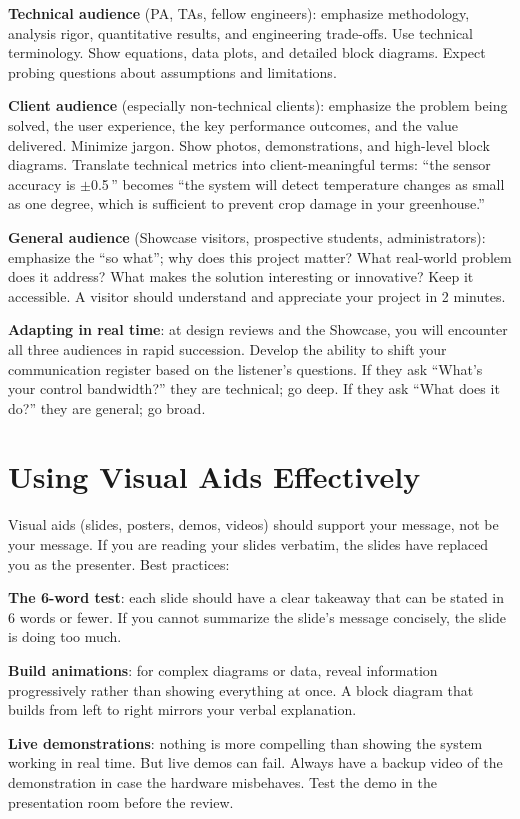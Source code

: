 \textbf{Technical audience} (PA, TAs, fellow engineers): emphasize methodology, analysis rigor, quantitative results, and engineering trade-offs. Use technical terminology. Show equations, data plots, and detailed block diagrams. Expect probing questions about assumptions and limitations.

\textbf{Client audience} (especially non-technical clients): emphasize the problem being solved, the user experience, the key performance outcomes, and the value delivered. Minimize jargon. Show photos, demonstrations, and high-level block diagrams. Translate technical metrics into client-meaningful terms: ``the sensor accuracy is $\pm$0.5\,\degC{}'' becomes ``the system will detect temperature changes as small as one degree, which is sufficient to prevent crop damage in your greenhouse.''

\textbf{General audience} (Showcase visitors, prospective students, administrators): emphasize the ``so what''; why does this project matter? What real-world problem does it address? What makes the solution interesting or innovative? Keep it accessible. A visitor should understand and appreciate your project in 2 minutes.

\textbf{Adapting in real time}: at design reviews and the Showcase, you will encounter all three audiences in rapid succession. Develop the ability to shift your communication register based on the listener's questions. If they ask ``What's your control bandwidth?'' they are technical; go deep. If they ask ``What does it do?'' they are general; go broad.

\section{Using Visual Aids Effectively}
Visual aids (slides, posters, demos, videos) should support your message, not be your message. If you are reading your slides verbatim, the slides have replaced you as the presenter. Best practices:

\textbf{The 6-word test}: each slide should have a clear takeaway that can be stated in 6 words or fewer. If you cannot summarize the slide's message concisely, the slide is doing too much.

\textbf{Build animations}: for complex diagrams or data, reveal information progressively rather than showing everything at once. A block diagram that builds from left to right mirrors your verbal explanation.

\textbf{Live demonstrations}: nothing is more compelling than showing the system working in real time. But live demos can fail. Always have a backup video of the demonstration in case the hardware misbehaves. Test the demo in the presentation room before the review.

